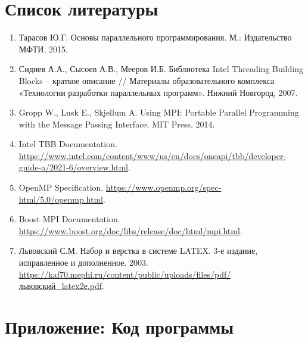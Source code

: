 \documentclass[a4paper,12pt]{article}
\begin{document}
\section*{Список литературы}
\begin{enumerate}
    \item Тарасов Ю.Г. Основы параллельного программирования. М.: Издательство МФТИ, 2015.
    \item Сиднев А.А., Сысоев А.В., Мееров И.Б. Библиотека Intel Threading Building Blocks – краткое описание // Материалы образовательного комплекса «Технологии разработки параллельных программ». Нижний Новгород, 2007.
    \item Gropp W., Lusk E., Skjellum A. Using MPI: Portable Parallel Programming with the Message Passing Interface. MIT Press, 2014.
    \item Intel TBB Documentation. \url{https://www.intel.com/content/www/us/en/docs/oneapi/tbb/developer-guide-a/2021-6/overview.html}.
    \item OpenMP Specification. \url{https://www.openmp.org/spec-html/5.0/openmp.html}.
    \item Boost MPI Documentation. \url{https://www.boost.org/doc/libs/release/doc/html/mpi.html}.
    \item Львовский С.М. Набор и верстка в системе LATEX. 3-е издание, исправленное и дополненное. 2003. \url{https://kaf70.mephi.ru/content/public/uploads/files/pdf/львовский_latex2е.pdf}.
\end{enumerate}


\section*{Приложение: Код программы}
\end{document}
